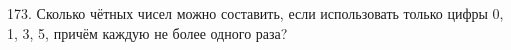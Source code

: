173. Сколько чётных чисел можно составить, если использовать только цифры 0, 1, 3, 5, причём каждую не более одного раза?\\
